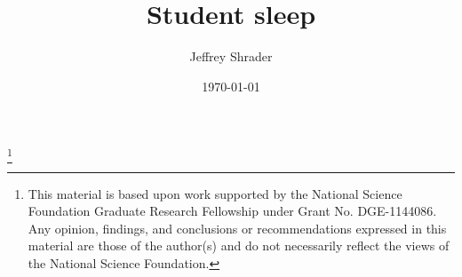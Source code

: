 \documentclass[mathserif,14pt]{beamer}
\begin{document}
\author{Jeffrey Shrader}
\thanks{\tiny This material is based upon work supported by the National Science Foundation Graduate Research Fellowship under Grant No. DGE-1144086. Any opinion, findings, and conclusions or recommendations expressed in this material are those of the author(s) and do not necessarily reflect the views of the National Science Foundation.}
\date{\today}


\title{Student sleep}

\begin{frame}
\titlepage
\end{frame}

\begin{frame}

\end{frame}



\end{document}
